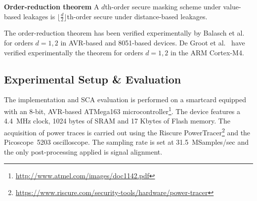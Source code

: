 \vspace{0.15cm}
\noindent\textbf{Order-reduction theorem} A $d$th-order secure masking scheme under value-based leakages is $\lfloor \frac{d}{2} \rfloor$th-order secure under distance-based leakages.
\vspace{0.15cm}

The order-reduction theorem has been verified experimentally by Balasch et al.~\cite{DBLP:conf/cardis/BalaschGGRS14} for orders $d=1,2$ in AVR-based and 8051-based devices. De Groot et al.~\cite{DBLP:journals/iacr/GrootPPSB16} have verified experimentally the theorem for orders $d=1,2$ in the ARM Cortex-M4.

\subsection{Experimental Setup \& Evaluation}
The implementation and SCA evaluation is performed on a smartcard equipped with an 8-bit, AVR-based ATMega163 microcontroller\footnote{\url{http://www.atmel.com/images/doc1142.pdf}}. 
The device features a 4.4~MHz clock, 1024 bytes of SRAM and 17 Kbytes of Flash memory. 
The acquisition of power traces is carried out using the Riscure PowerTracer\footnote{\url{https://www.riscure.com/security-tools/hardware/power-tracer}} and the Picoscope~5203 oscilloscope. The sampling rate is set at 31.5~MSamples/sec and the only post-processing applied is signal alignment.


